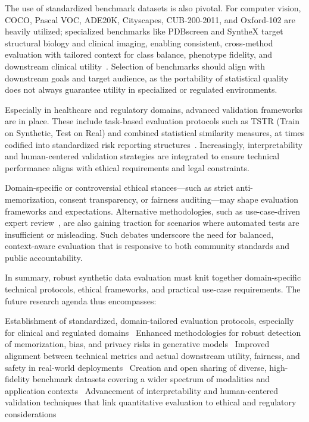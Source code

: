 \documentclass[sigconf]{acmart}
\begin{document}
The use of standardized benchmark datasets is also pivotal. For computer vision, COCO, Pascal VOC, ADE20K, Cityscapes, CUB-200-2011, and Oxford-102 are heavily utilized; specialized benchmarks like PDBscreen and SyntheX target structural biology and clinical imaging, enabling consistent, cross-method evaluation with tailored context for class balance, phenotype fidelity, and downstream clinical utility~\cite{ref31}\cite{ref34}\cite{ref43}\cite{ref79}\cite{ref81}. Selection of benchmarks should align with downstream goals and target audience, as the portability of statistical quality does not always guarantee utility in specialized or regulated environments.

Especially in healthcare and regulatory domains, advanced validation frameworks are in place. These include task-based evaluation protocols such as TSTR (Train on Synthetic, Test on Real) and combined statistical similarity measures, at times codified into standardized risk reporting structures~\cite{ref1}\cite{ref87}\cite{ref88}\cite{ref89}. Increasingly, interpretability and human-centered validation strategies are integrated to ensure technical performance aligns with ethical requirements and legal constraints.

Domain-specific or controversial ethical stances—such as strict anti-memorization, consent transparency, or fairness auditing—may shape evaluation frameworks and expectations. Alternative methodologies, such as use-case-driven expert review~\cite{ref2}, are also gaining traction for scenarios where automated tests are insufficient or misleading. Such debates underscore the need for balanced, context-aware evaluation that is responsive to both community standards and public accountability.

In summary, robust synthetic data evaluation must knit together domain-specific technical protocols, ethical frameworks, and practical use-case requirements. The future research agenda thus encompasses:

Establishment of standardized, domain-tailored evaluation protocols, especially for clinical and regulated domains~\cite{ref89}\cite{ref88}
Enhanced methodologies for robust detection of memorization, bias, and privacy risks in generative models~\cite{ref21}\cite{ref87}
Improved alignment between technical metrics and actual downstream utility, fairness, and safety in real-world deployments~\cite{ref88}\cite{ref1}
Creation and open sharing of diverse, high-fidelity benchmark datasets covering a wider spectrum of modalities and application contexts~\cite{ref89}\cite{ref81}
Advancement of interpretability and human-centered validation techniques that link quantitative evaluation to ethical and regulatory considerations~\cite{ref87}
\end{document}
